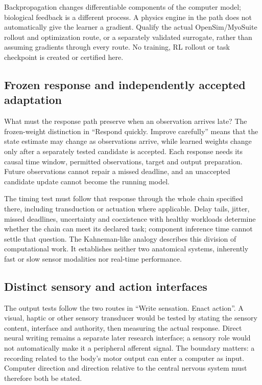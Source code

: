 Backpropagation changes differentiable components of the computer model;
biological feedback is a different process. A physics engine in the path does
not automatically give the learner a gradient. Qualify the actual
OpenSim/MyoSuite rollout and optimization route, or a separately validated
surrogate, rather than assuming gradients through every route. No training,
RL rollout or task checkpoint is created or certified here.

\subsection{Frozen response and independently accepted adaptation}

What must the response path preserve when an observation arrives late? The frozen-weight distinction in ``Respond quickly. Improve carefully'' means that the state estimate may change as observations arrive, while learned weights change only after a separately tested candidate is accepted. Each response needs its causal time window, permitted observations, target and output preparation. Future observations cannot repair a missed deadline, and an unaccepted candidate update cannot become the running model.

The timing test must follow that response through the whole chain specified there, including transduction or actuation where applicable. Delay tails, jitter, missed deadlines, uncertainty and coexistence with healthy workloads determine whether the chain can meet its declared task; component inference time cannot settle that question. The Kahneman-like analogy describes this division of computational work. It establishes neither two anatomical systems, inherently fast or slow sensor modalities nor real-time performance.

\subsection{Distinct sensory and action interfaces}

The output tests follow the two routes in ``Write sensation. Enact action''. A visual, haptic or other sensory transducer would be tested by stating the sensory content, interface and authority, then measuring the actual response. Direct neural writing remains a separate later research interface; a sensory role would not automatically make it a peripheral afferent signal. The boundary matters: a recording related to the body's motor output can enter a computer as input. Computer direction and direction relative to the central nervous system must therefore both be stated.


